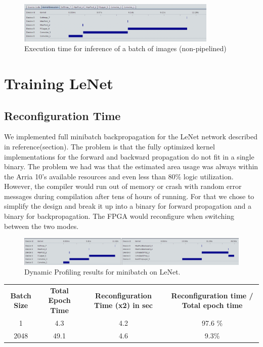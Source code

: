 \begin{figure}[h!]
\centering
\includegraphics[width=0.85\textwidth]{Figures/nonpipebatch}
\decoRule
\caption[nonpipebatch]{ Execution time for inference of a batch of images (non-pipelined)}
\label{fig:nonpipebatch}
\end{figure}


\newpage
\section{Training LeNet}

\subsection{Reconfiguration Time}

We implemented full minibatch backpropagation for the LeNet network described in reference(section). The problem is that the fully optimized kernel implementations for the forward and backward propagation do not fit in a single binary. The problem we had was that the estimated area usage was always within the Arria 10's available resources and even less than 80\% logic utilization. However, the compiler would run out of memory or crash with random error messages during compilation after tens of hours of running. For that we chose to simplify the design and break it up into a binary for forward propagation and a binary for backpropagation. The FPGA would reconfigure when switching between the two modes. 

\begin{figure}[h!]
\centering
\includegraphics[width=1.0\textwidth]{Figures/fullprop}
\decoRule
\caption[fullprop]{ Dynamic Profiling results for minibatch on LeNet. }
\label{fig:fullprop}
\end{figure}


\begin{table}[]
\begin{tabular}{cccc}
\textbf{Batch Size} & \textbf{Total Epoch Time} & \textbf{Reconfiguration Time (x2) in sec} & \textbf{Reconfiguration time / Total epoch time} \\
1                   & 4.3                       & 4.2                                       & 97.6 \%                                          \\
2048                & 49.1                      & 4.6                                       & 9.3\%                                           
\end{tabular}
\label{tab:reconfigure}
\end{table}

